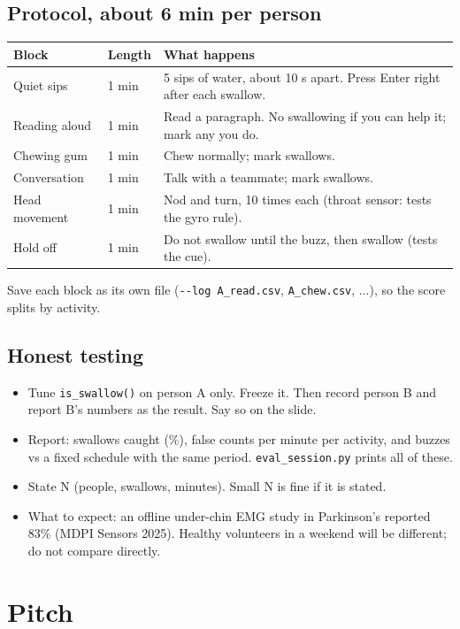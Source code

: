 \documentclass[10.5pt,a4paper]{article}
\newcommand{\f}[1]{\texttt{#1}}
\begin{document}
\subsection{Protocol, about 6 min per person}
\begin{tabularx}{\linewidth}{@{}p{3.2cm}p{2cm}L@{}}
\toprule
Block & Length & What happens\\
\midrule
Quiet sips & 1 min & 5 sips of water, about 10 s apart. Press Enter right after each swallow.\\
Reading aloud & 1 min & Read a paragraph. No swallowing if you can help it; mark any you do.\\
Chewing gum & 1 min & Chew normally; mark swallows.\\
Conversation & 1 min & Talk with a teammate; mark swallows.\\
Head movement & 1 min & Nod and turn, 10 times each (throat sensor: tests the gyro rule).\\
Hold off & 1 min & Do not swallow until the buzz, then swallow (tests the cue).\\
\bottomrule
\end{tabularx}
Save each block as its own file (\f{-{}-log A\_read.csv}, \f{A\_chew.csv}, ...), so the score splits by activity.

\subsection{Honest testing}
\begin{itemize}
\item Tune \f{is\_swallow()} on person A only. Freeze it. Then record person B and report B's numbers as the result. Say so on the slide.
\item Report: swallows caught (\%), false counts per minute per activity, and buzzes vs a fixed schedule with the same period. \f{eval\_session.py} prints all of these.
\item State N (people, swallows, minutes). Small N is fine if it is stated.
\item What to expect: an offline under-chin EMG study in Parkinson's reported 83\% (MDPI Sensors 2025). Healthy volunteers in a weekend will be different; do not compare directly.
\end{itemize}

\section{Pitch}
\end{document}
